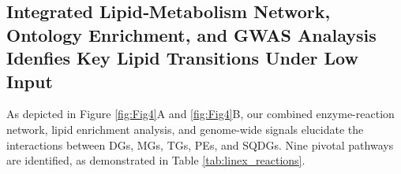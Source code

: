 \documentclass[10pt,letterpaper]{article}
\begin{document}







\subsection*{Integrated Lipid‐Metabolism Network, Ontology Enrichment, and GWAS Analaysis Idenfies Key Lipid Transitions Under Low Input}

As depicted in Figure \ref{fig:Fig4}A and \ref{fig:Fig4}B, our combined enzyme-reaction network, lipid enrichment analysis, and genome-wide signals elucidate the interactions between DGs, MGs, TGs, PEs, and SQDGs. Nine pivotal pathways are identified, as demonstrated in Table \ref{tab:linex_reactions}.
\end{document}
